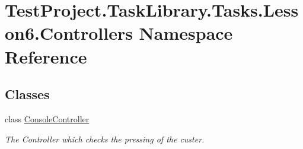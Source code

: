 \hypertarget{namespace_test_project_1_1_task_library_1_1_tasks_1_1_lesson6_1_1_controllers}{}\section{Test\+Project.\+Task\+Library.\+Tasks.\+Lesson6.\+Controllers Namespace Reference}
\label{namespace_test_project_1_1_task_library_1_1_tasks_1_1_lesson6_1_1_controllers}
\subsection*{Classes}
\begin{DoxyCompactItemize}
\item 
class \mbox{\hyperlink{class_test_project_1_1_task_library_1_1_tasks_1_1_lesson6_1_1_controllers_1_1_console_controller}{Console\+Controller}}
\begin{DoxyCompactList}\small\item\em The Controller which checks the pressing of the custer. \end{DoxyCompactList}\end{DoxyCompactItemize}
